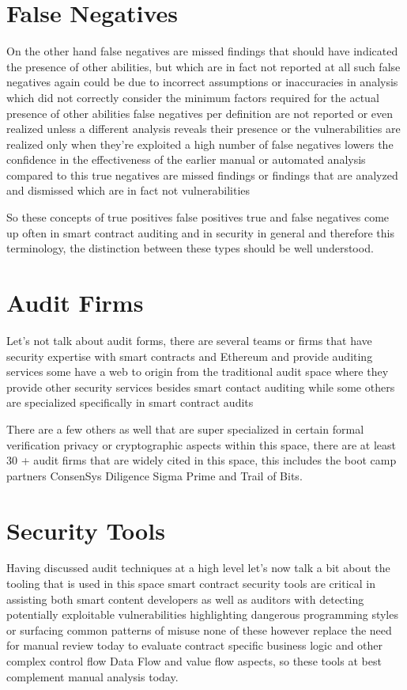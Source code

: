 \section{False Negatives}

On the other hand false negatives are missed findings that should have indicated the presence of other abilities, but which are in fact not reported at all such false negatives again could be due to incorrect assumptions or inaccuracies in analysis which did not correctly consider the minimum factors required for the actual presence of other abilities false negatives per definition are not reported or even realized unless a different analysis reveals their presence or the vulnerabilities are realized only when they're exploited a high number of false negatives lowers the confidence in the effectiveness of the earlier manual or automated analysis compared to this true negatives are missed findings or findings that are analyzed and dismissed which are in fact not vulnerabilities

So these concepts of true positives false positives true and false negatives come up often in smart contract auditing and in security in general and therefore this terminology, the distinction between these types should be well understood.

\section{Audit Firms}

Let's not talk about audit forms, there are several teams or firms that have security expertise with smart contracts and Ethereum and provide auditing services some have a web to origin from the traditional audit space where they provide other security services besides smart contact auditing while some others are specialized specifically in smart contract audits

There are a few others as well that are super specialized in certain formal verification privacy or cryptographic aspects within this space, there are at least 30 + audit firms that are widely cited in this space, this includes the boot camp partners ConsenSys Diligence Sigma Prime and Trail of Bits.

\section{Security Tools}

Having discussed audit techniques at a high level let's now talk a bit about the tooling that is used in this space smart contract security tools are critical in assisting both smart content developers as well as auditors with detecting potentially exploitable vulnerabilities highlighting dangerous programming styles or surfacing common patterns of misuse none of these however replace the need for manual review today to evaluate contract specific business logic and other complex control flow Data Flow and value flow aspects, so these tools at best complement manual analysis today.


